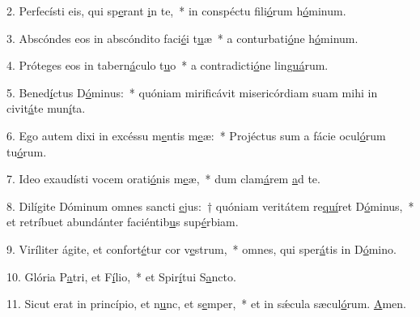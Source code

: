 2. Perfecísti eis, qui sp\uline{e}rant \uline{i}n te,~* in conspéctu fili\uline{ó}rum h\uline{ó}minum.\par 
3. Abscóndes eos in abscóndito faci\uline{é}i t\uline{u}æ~* a conturbati\uline{ó}ne h\uline{ó}minum.\par 
4. Próteges eos in tabern\uline{á}culo t\uline{u}o~* a contradicti\uline{ó}ne lin\uline{guá}rum.\par 
5. Bened\uline{í}ctus D\uline{ó}minus:~* quóniam mirificávit misericórdiam suam mihi in civit\uline{á}te mun\uline{í}ta.\par 
6. Ego autem dixi in excéssu m\uline{e}ntis m\uline{e}æ:~* Projéctus sum a fácie ocul\uline{ó}rum tu\uline{ó}rum.\par 
7. Ideo exaudísti vocem orati\uline{ó}nis m\uline{e}æ,~* dum clam\uline{á}rem \uline{a}d te.\par 
8. Dilígite Dóminum omnes sancti \uline{e}jus:~† quóniam veritátem re\uline{quí}ret D\uline{ó}minus,~* et retríbuet abundánter faciéntib\uline{u}s sup\uline{é}rbiam.\par 
9. Viríliter ágite, et confort\uline{é}tur cor v\uline{e}strum,~* omnes, qui sper\uline{á}tis in D\uline{ó}mino.\par 
10. Glória P\uline{a}tri, et F\uline{í}lio,~* et Spir\uline{í}tui S\uline{a}ncto.\par 
11. Sicut erat in princípio, et n\uline{u}nc, et s\uline{e}mper,~* et in sǽcula sæcul\uline{ó}rum. \uline{A}men.\par 
